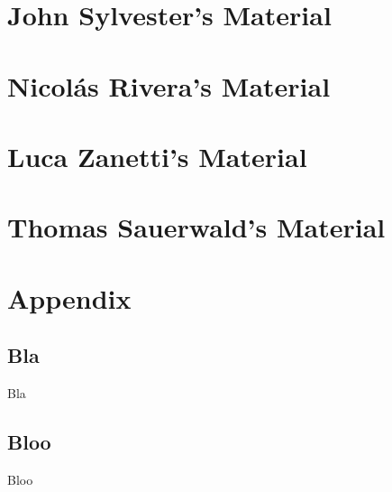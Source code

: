 \documentclass[unit]{previsionnotes}
\begin{document}
	\maketitle
	\tableofcontents
	
	
	
	\part{John Sylvester's Material}

		

		

		

	\part{Nicolás Rivera's Material}
		
		

		

	\part{Luca Zanetti's Material}

		

		

	\part{Thomas Sauerwald's Material}

		

		

	\part*{Appendix}
	
	\appendix
	\chapter{Bla}
	Bla
	\chapter{Bloo}
	Bloo
\end{document}
